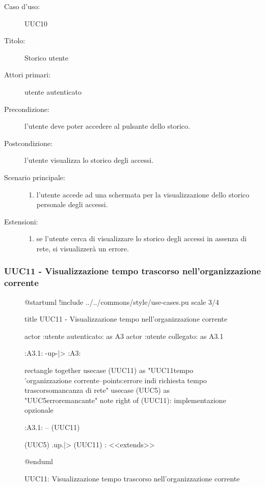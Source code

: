 \documentclass[casi-duso]{subfiles}
\begin{document}
\begin{description}
  \item[Caso d’uso:] UUC10
  \item[Titolo:] Storico utente
  \item[Attori primari:] utente autenticato
  \item[Precondizione:]  l'utente deve poter accedere al pulsante dello storico.
  \item[Postcondizione:] l'utente visualizza lo storico degli accessi.
  \item[Scenario principale:]
        \begin{enumerate}
          \item l'utente accede ad una schermata per la visualizzazione dello storico personale degli accessi.
        \end{enumerate}
  \item[Estensioni:]
        \begin{enumerate}
          \item se l'utente cerca di visualizzare lo storico degli accessi in assenza di rete, si visualizzerà un errore.
        \end{enumerate}
\end{description}

\subsubsection{UUC11 - Visualizzazione tempo trascorso nell'organizzazione corrente}%
\label{subsub:UUC11utente}

\begin{figure}[h!] 
  \centering 
  \begin{plantuml}
  @startuml
  !include ../../commons/style/use-cases.pu
  scale 3/4

  title UUC11 - Visualizzazione tempo nell'organizzazione corrente

  actor :utente autenticato: as A3
  actor :utente collegato: as A3.1

  :A3.1: -up-|> :A3:

  rectangle {
    together {
      usecase (UUC11) as "UUC11\nVisualizzazione tempo \nnell'organizzazione corrente\n--\nExtension points:\nVisualizzazione errore in\ncaso di richiesta tempo trascorso\nin mancanza di rete"
      usecase (UUC5) as "UUC5\nVisualizzazione errore\nrete mancante"
      note right of (UUC11): implementazione opzionale
    }
  }

  :A3.1: -- (UUC11)

  (UUC5) .up.|> (UUC11) : <<extends>>

  @enduml
  \end{plantuml} 
  \caption{UUC11: Visualizzazione tempo trascorso nell'organizzazione corrente} 
  \label{fig:uuc11} 
\end{figure}
\end{document}
